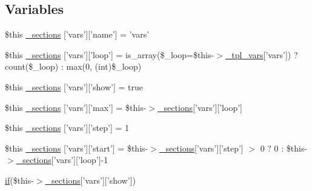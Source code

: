 \subsection*{\-Variables}
\begin{DoxyCompactItemize}
\item 
\$this \hyperlink{default_234d6fa4bfd5eef6424a9ddc74a166350_2_06_06708_05_06_06708843835_05var_8tpl_8php_abda03313e9c9be714d9e54ae50e3d62a}{\-\_\-sections} \mbox{[}'vars'\mbox{]}\mbox{[}'name'\mbox{]} = 'vars'
\item 
\$this \hyperlink{default_234d6fa4bfd5eef6424a9ddc74a166350_2_06_06708_05_06_06708843835_05var_8tpl_8php_a9db6f58b94753d2bc1efbc08eaea4d63}{\-\_\-sections} \mbox{[}'vars'\mbox{]}\mbox{[}'loop'\mbox{]} = is\-\_\-array(\$\-\_\-loop=\$this-\/$>$\hyperlink{_06_06127_05_06_0612781687_05pkgelementindex_8tpl_8php_a4a4846d8e68d455590131a05697f67a3}{\-\_\-tpl\-\_\-vars}\mbox{[}'vars'\mbox{]}) ? count(\$\-\_\-loop) \-: max(0, (int)\$\-\_\-loop)
\item 
\$this \hyperlink{default_234d6fa4bfd5eef6424a9ddc74a166350_2_06_06708_05_06_06708843835_05var_8tpl_8php_a64dbbc8be8d3f61e9507ad21ae97e883}{\-\_\-sections} \mbox{[}'vars'\mbox{]}\mbox{[}'show'\mbox{]} = true
\item 
\$this \hyperlink{default_234d6fa4bfd5eef6424a9ddc74a166350_2_06_06708_05_06_06708843835_05var_8tpl_8php_adafabdb57ae52f1caf1c56505bc47ec3}{\-\_\-sections} \mbox{[}'vars'\mbox{]}\mbox{[}'max'\mbox{]} = \$this-\/$>$\hyperlink{_06_06127_05_06_0612781687_05pkgelementindex_8tpl_8php_a9e3d26b39edfe29c3f29b8035ef33828}{\-\_\-sections}\mbox{[}'vars'\mbox{]}\mbox{[}'loop'\mbox{]}
\item 
\$this \hyperlink{default_234d6fa4bfd5eef6424a9ddc74a166350_2_06_06708_05_06_06708843835_05var_8tpl_8php_a9020f074629c1d58d6b3345c11d134a3}{\-\_\-sections} \mbox{[}'vars'\mbox{]}\mbox{[}'step'\mbox{]} = 1
\item 
\$this \hyperlink{default_234d6fa4bfd5eef6424a9ddc74a166350_2_06_06708_05_06_06708843835_05var_8tpl_8php_adaa939777da845d9eeb78ea1dd5cbb20}{\-\_\-sections} \mbox{[}'vars'\mbox{]}\mbox{[}'start'\mbox{]} = \$this-\/$>$\hyperlink{_06_06127_05_06_0612781687_05pkgelementindex_8tpl_8php_a9e3d26b39edfe29c3f29b8035ef33828}{\-\_\-sections}\mbox{[}'vars'\mbox{]}\mbox{[}'step'\mbox{]} $>$ 0 ? 0 \-: \$this-\/$>$\hyperlink{_06_06127_05_06_0612781687_05pkgelementindex_8tpl_8php_a9e3d26b39edfe29c3f29b8035ef33828}{\-\_\-sections}\mbox{[}'vars'\mbox{]}\mbox{[}'loop'\mbox{]}-\/1
\item 
\hyperlink{_setup_8inc_8php_ad0184337b31d13763ec8751feff4aabe}{if}(\$this-\/$>$\hyperlink{_06_06127_05_06_0612781687_05pkgelementindex_8tpl_8php_a9e3d26b39edfe29c3f29b8035ef33828}{\-\_\-sections}\mbox{[}'vars'\mbox{]}\mbox{[}'show'\mbox{]}) \*

\end{DoxyCompactItemize}
